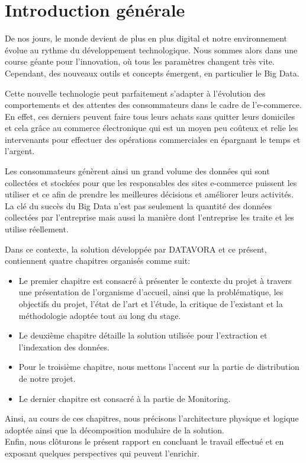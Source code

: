 \chapter*{Introduction générale}

De nos jours, le monde devient de plus en plus digital et notre environnement évolue au rythme du développement technologique. Nous sommes alors dans une course géante pour l'innovation, où tous les paramètres changent très vite. Cependant, des nouveaux outils et concepts émergent, en particulier le Big Data.

Cette nouvelle technologie peut parfaitement s'adapter à l'évolution des comportements et des attentes des consommateurs dans le cadre de l'e-commerce. En effet, ces derniers peuvent faire tous leurs achats sans quitter leurs domiciles et cela grâce au commerce électronique qui est un moyen peu coûteux et relie les intervenants pour effectuer des opérations commerciales en épargnant le temps et l'argent.

Les consommateurs génèrent ainsi un grand volume des données qui sont collectées et stockées pour que les responsables des sites e-commerce puissent les utiliser et ce afin de prendre les meilleures décisions et améliorer leurs activités.
La clé du succès du Big Data n'est pas seulement la quantité des données collectées par l'entreprise mais aussi la manière dont l'entreprise les traite et les utilise réellement.

Dans ce contexte, la solution développée par DATAVORA et ce présent, contiennent quatre chapitres organisés comme suit:
\begin{itemize}
    \item Le premier chapitre est consacré à présenter le contexte du projet à travers une présentation de l’organisme d’accueil, ainsi que la problématique, les objectifs du projet, l'état de l'art et l'étude, la critique de l'existant et la méthodologie adoptée tout au long du stage.
    \item Le deuxième chapitre détaille la solution utilisée pour l'extraction et l'indexation des données.
    \item Pour le troisième chapitre, nous mettons l'accent sur la partie de distribution de notre projet.
    \item Le dernier chapitre est consacré à la partie de Monitoring.
\end{itemize}
\newpage
Ainsi, au cours de ces chapitres, nous précisons l’architecture physique et logique adoptée ainsi que la décomposition modulaire de la solution. \\

Enfin, nous clôturons le présent rapport en concluant le travail effectué et en exposant quelques perspectives qui peuvent l'enrichir.